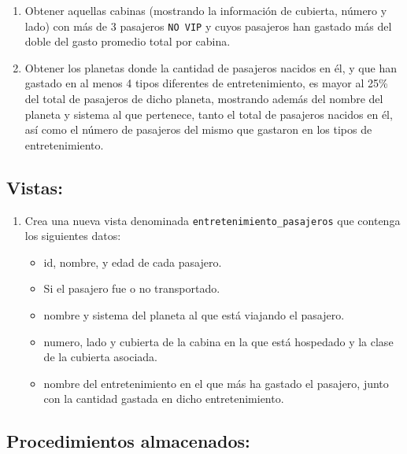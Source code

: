 \documentclass{db-practice}
\begin{document}
\begin{enumerate}
    \item Obtener aquellas cabinas (mostrando la información de cubierta, número y lado) con más de 3 pasajeros \texttt{NO VIP} y cuyos pasajeros han gastado más del doble del gasto promedio total por cabina.
    \item Obtener los planetas donde la cantidad de pasajeros nacidos en él, y que han gastado en al menos 4 tipos diferentes de entretenimiento, es mayor al 25\% del total de pasajeros de dicho planeta, mostrando además del nombre del planeta y sistema al que pertenece, tanto el total de pasajeros nacidos en él, así como el número de pasajeros del mismo que gastaron en los tipos de entretenimiento.

\end{enumerate}

\subsection*{Vistas:}

\begin{enumerate}
    \item  Crea una nueva vista denominada \texttt{entretenimiento\_pasajeros} que contenga los siguientes datos:

    \begin{itemize}
        \item id, nombre, y edad de cada pasajero.
        \item Si el pasajero fue o no transportado.
        \item nombre y sistema del planeta al que está viajando el pasajero.
        \item numero, lado y cubierta de la cabina en la que está hospedado y la clase de la cubierta asociada.
        \item nombre del entretenimiento en el que más ha gastado el pasajero, junto con la cantidad gastada en dicho entretenimiento.
    \end{itemize}
\end{enumerate}

\subsection*{Procedimientos almacenados:}
\end{document}
